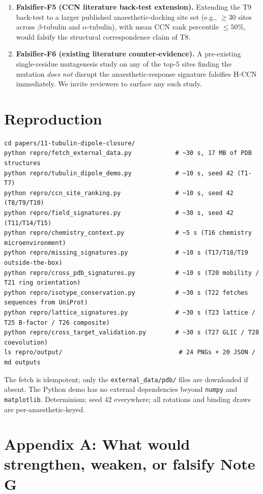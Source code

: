 \documentclass[11pt,a4paper]{article}
\begin{document}
\begin{enumerate}
    favours $\beta$Y$185$), the disagreement is itself the H-CCN
    field-level signature.
  \item \textbf{Falsifier-F5 (CCN literature back-test extension).}
    Extending the T9 back-test to a larger published anaesthetic-docking
    site set (e.g., $\geq 30$ sites across $\beta$-tubulin and
    $\alpha$-tubulin), with mean CCN rank percentile $\leq 50\%$,
    would falsify the structural correspondence claim of T8.
  \item \textbf{Falsifier-F6 (existing literature counter-evidence).}
    A pre-existing single-residue mutagenesis study on any of the
    top-$5$ sites finding the mutation \emph{does not} disrupt the
    anaesthetic-response signature falsifies H-CCN immediately. We
    invite reviewers to surface any such study.
\end{enumerate}

\section{Reproduction}

\begin{verbatim}
cd papers/11-tubulin-dipole-closure/
python repro/fetch_external_data.py            # ~30 s, 17 MB of PDB structures
python repro/tubulin_dipole_demo.py            # ~10 s, seed 42 (T1-T7)
python repro/ccn_site_ranking.py               # ~10 s, seed 42 (T8/T9/T10)
python repro/field_signatures.py               # ~30 s, seed 42 (T11/T14/T15)
python repro/chemistry_context.py              # ~5 s (T16 chemistry microenvironment)
python repro/missing_signatures.py             # ~10 s (T17/T18/T19 outside-the-box)
python repro/cross_pdb_signatures.py           # ~10 s (T20 mobility / T21 ring orientation)
python repro/isotype_conservation.py           # ~30 s (T22 fetches sequences from UniProt)
python repro/lattice_signatures.py             # ~30 s (T23 lattice / T25 B-factor / T26 composite)
python repro/cross_target_validation.py        # ~30 s (T27 GLIC / T28 coevolution)
ls repro/output/                                # 24 PNGs + 20 JSON / md outputs
\end{verbatim}
The fetch is idempotent; only the \texttt{external\_data/pdb/} files
are downloaded if absent. The Python demo has no external dependencies
beyond \texttt{numpy} and \texttt{matplotlib}. Determinism: seed $42$
everywhere; all rotations and binding draws are per-anaesthetic-keyed.

\appendix

\section*{Appendix A: What would strengthen, weaken, or falsify Note G}
\end{document}
